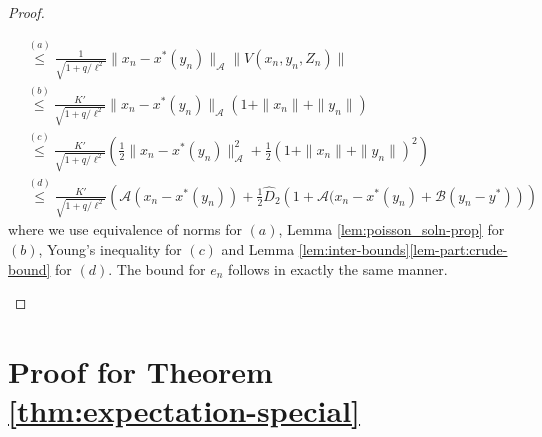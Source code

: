 \documentclass[letterpaper, 10 pt, conference]{ieeeconf}  %
\theoremstyle{definition}
\theoremstyle{plain}
\newcommand{\xstar}{x^*}
\newcommand{\hD}{\hat{D}}
\newcommand{\Acal}{\mathcal{A}}
\newcommand{\Bcal}{\mathcal{B}}
\begin{document}
\begin{proof}
\begin{enumerate}[label=(\alph*)]
\begin{align*}
        &\stackrel{(a)}{\leq} \frac{1}{\sqrt{1+q/\ell^2}}\|x_n-\xstar(y_n)\|_\Acal\|V(x_n,y_n,Z_n)\|\\
        &\stackrel{(b)}{\leq} \frac{K'}{\sqrt{1+q/\ell^2}}\|x_n-\xstar(y_n)\|_\Acal(1+\|x_n\|+\|y_n\|)\\
        &\stackrel{(c)}{\leq} \frac{K'}{\sqrt{1+q/\ell^2}}\left(\frac{1}{2}\|x_n-\xstar(y_n)\|_\Acal^2+\frac{1}{2}(1+\|x_n\|+\|y_n\|)^2\right)\\
        &\stackrel{(d)}{\leq} \frac{K'}{\sqrt{1+q/\ell^2}}\left(\Acal(x_n-\xstar(y_n))+\frac{1}{2}\hD_2\left(1+\Acal(x_n-x^*(y_n)+\Bcal(y_n-y^*)\right)\right)
    \end{align*}
    where we use equivalence of norms for $(a)$, Lemma \ref{lem:poisson_soln-prop} for $(b)$, Young's inequality for $(c)$ and Lemma \ref{lem:inter-bounds}\ref{lem-part:crude-bound} for $(d)$. The bound for $e_n$ follows in exactly the same manner.
    \end{enumerate}
\end{proof}

\section{Proof for Theorem \ref{thm:expectation-special}}\label{app:proof-special}
\end{document}
